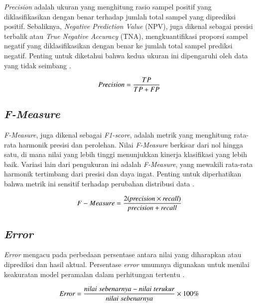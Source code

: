 \emph{Precision} adalah ukuran yang menghitung rasio sampel positif yang diklasifikasikan dengan benar terhadap jumlah total sampel yang diprediksi positif. Sebaliknya, \emph{Negative Prediction Value} (NPV), juga dikenal sebagai presisi terbalik atau \emph{True Negative Accuracy} (TNA), mengkuantifikasi proporsi sampel negatif yang diklasifikasikan dengan benar ke jumlah total sampel prediksi negatif. Penting untuk diketahui bahwa kedua ukuran ini dipengaruhi oleh data yang tidak seimbang \parencite{Tharwat}.

\begin{equation}
  \label{eq:KonversiPanjangLangkah}
  \emph{Precision} = \frac{TP}{TP + FP}
\end{equation}

\subsection{\emph{F-Measure}}
\label{subsec:cnn}

\emph{F-Measure}, juga dikenal sebagai \emph{F1-score}, adalah metrik yang menghitung rata-rata harmonik presisi dan perolehan. Nilai \emph{F-Measure} berkisar dari nol hingga satu, di mana nilai yang lebih tinggi menunjukkan kinerja klasifikasi yang lebih baik. Variasi lain dari pengukuran ini adalah \emph{F-Measure}, yang mewakili rata-rata harmonik tertimbang dari presisi dan daya ingat. Penting untuk diperhatikan bahwa metrik ini sensitif terhadap perubahan distribusi data \parencite{Tharwat}.

\begin{equation}
  \label{eq:KonversiPanjangLangkah}
  F-Measure = \frac{2 (\emph{precision}\times\emph{recall})}{\emph{precision} + \emph{recall}}
\end{equation}

\subsection{\emph{Error}}
\label{subsec:cnn}

\emph{Error} mengacu pada perbedaan persentase antara nilai yang diharapkan atau diprediksi dan hasil aktual. Persentase \emph{error} umumnya digunakan untuk menilai keakuratan model peramalan dalam perhitungan tertentu \parencite{Deepthi}.

\begin{equation}
  \label{eq:KonversiPanjangLangkah}
  \emph{Error} = \frac{nilai \; sebenarnya - nilai \; terukur}{nilai \; sebenarnya} \times 100\%
\end{equation}

